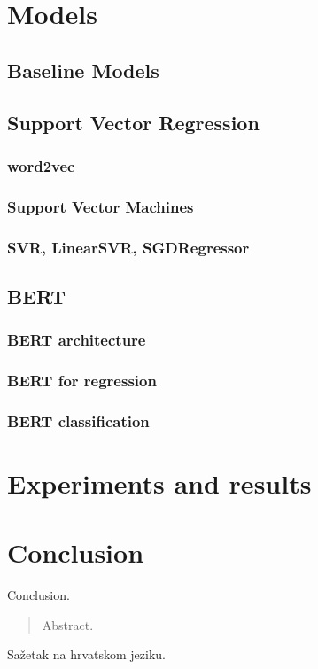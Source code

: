 \documentclass[times, utf8, zavrsni, english]{fer}
\begin{document}
\chapter{Models}

\section{Baseline Models}
\section{Support Vector Regression}
\subsection{word2vec}
\subsection{Support Vector Machines}
\subsection{SVR, LinearSVR, SGDRegressor}

\section{BERT}
\subsection{BERT architecture}
\subsection{BERT for regression}
\subsection{BERT classification}

\chapter{Experiments and results}

\chapter{Conclusion}
Conclusion.




\listoffigures
\begin{abstract}
Abstract.

\end{abstract}

\begin{sazetak}
Sažetak na hrvatskom jeziku.

\end{sazetak}
\end{document}
